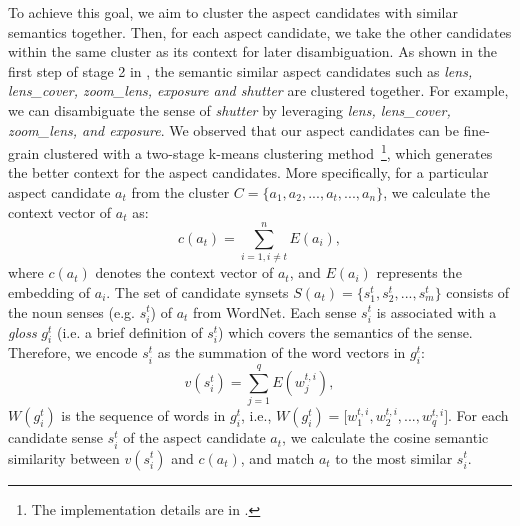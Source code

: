 To achieve this goal, we aim to cluster
the aspect candidates with similar semantics together.
Then, for each aspect candidate, 
we take the other candidates within the same cluster
as its context for later disambiguation.
As shown in the first step of stage 2 in , 
the semantic similar aspect candidates such as 
{\em lens, lens\_cover, zoom\_lens, exposure and shutter}
are clustered together.
For example, we can disambiguate the sense of \emph{shutter} by 
leveraging {\em lens, lens\_cover, zoom\_lens, and exposure}.
We observed that our aspect candidates can be fine-grain 
clustered with a two-stage k-means clustering 
method~\footnote{The implementation details are in .}, 
which generates the better context for the 
aspect candidates.  More specifically, for a particular aspect candidate $a_t$ 
from the cluster $C = \lbrace a_1, a_2, ..., a_t, ..., a_n \rbrace$, 
we calculate the context vector of $a_t$ as:
\begin{equation}
c(a_t) = \sum_{i=1, i\neq t}^{n} E(a_i),
\end{equation}
where $c(a_t)$ denotes the context vector of $a_t$, 
and $E(a_i)$ represents the embedding of $a_i$.
The set of candidate synsets 
$S(a_t) = \lbrace s^t_1, s^t_2, ..., s^t_m \rbrace$ 
consists of the noun senses (e.g. $s^t_i$) of $a_t$  from WordNet.
Each sense $s^t_i$ is associated with a \emph{gloss} $g^t_i$
(i.e. a brief definition of $s^t_i$) which 
covers the semantics of the sense.
Therefore, we encode $s^t_i$ as the summation
of the word vectors in $g^t_i$:
\begin{equation}
v(s^t_i) = \sum_{j=1}^{q} E(w^{t,i}_j),
\end{equation}
$W(g^t_i)$ is the sequence of words in $g^t_i$, i.e., 
$W(g^t_i) = \lbrack w^{t,i}_1, w^{t,i}_2, ..., w^{t,i}_q \rbrack$.
For each candidate sense $s^t_i$ of 
the aspect candidate $a_t$,
we calculate the cosine semantic similarity
between $v(s^t_i)$ and $c(a_t)$, and
match $a_t$ to the most similar $s^t_i$.



